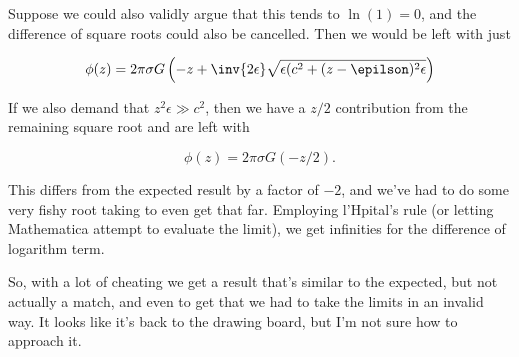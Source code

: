 Suppose we could also validly argue that this tends to $\ln(1) = 0$, and the difference of square roots could also be cancelled.  Then we would be left with just

\begin{equation}\label{eqn:classicalMechanicsPs2:n}
\phi(z) = 2 \pi \sigma G \left(-z + \inv{2\epsilon} \sqrt{\epsilon(c^2 + (z - \epilson)^2\epsilon} \right)
\end{equation}

If we also demand that $z^2 \epsilon \gg c^2$, then we have a $z/2$ contribution from the remaining square root and are left with

\begin{equation}\label{eqn:classicalMechanicsPs2:n}
\phi(z) = 2 \pi \sigma G (-z/2).
\end{equation}

This differs from the expected result by a factor of $-2$, and we've had to do some very fishy root taking to even get that far.  Employing l'Hpital's rule (or letting Mathematica attempt to evaluate the limit), we get infinities for the difference of logarithm term.

So, with a lot of cheating we get a result that's similar to the expected, but not actually a match, and even to get that we had to take the limits in an invalid way.  It looks like it's back to the drawing board, but I'm not sure how to approach it.

\EndNoBibArticle
